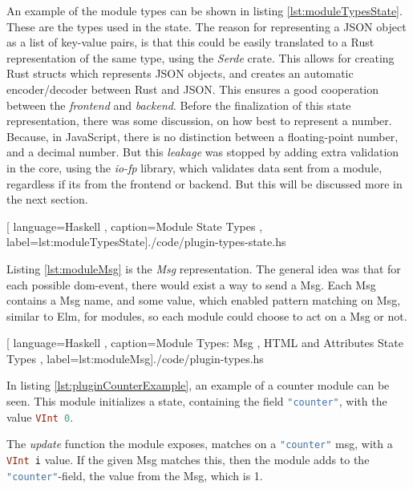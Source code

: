An example of the module types can be shown in listing
\ref{lst:moduleTypesState}. These are the types used in the state. The reason
for representing a JSON object as a list of key-value pairs, is that this could
be easily translated to a Rust representation of the same type, using the
\textit{Serde} crate. This allows for creating Rust structs which represents
JSON objects, and creates an automatic encoder/decoder between Rust and JSON.
This ensures a good cooperation between the \textit{frontend} and
\textit{backend}.
Before the finalization of this state representation, there was some
discussion, on how best to represent a number. Because, in JavaScript, there is
no distinction between a floating-point number, and a decimal number. But this
\textit{leakage} was stopped by adding extra validation in the core, using the
\textit{io-fp} library, which validates data sent from a module, regardless if
its from the frontend or backend. But this will be discussed more in the next
section.

\begin{center}
  
    [ language=Haskell
    , caption={Module State Types}
    , label=lst:moduleTypesState]{./code/plugin-types-state.hs}
\end{center}

Listing \ref{lst:moduleMsg} is the \textit{Msg} representation. The general idea
was that for each possible \gls{dom}-event, there would exist a way to send a
Msg. Each Msg contains a Msg name, and some value, which enabled pattern
matching on Msg, similar to Elm, for modules, so each module could choose to act
on a Msg or not.

\begin{center}
  \centering
  
    [ language=Haskell
    , caption={Module Types: Msg
    , HTML and Attributes State Types}
    , label=lst:moduleMsg]{./code/plugin-types.hs}
\end{center}

In listing \ref{lst:pluginCounterExample}, an example of a counter module can be
seen. This module initializes a state, containing the field
\lstinline[language=Haskell]{"counter"}, with the value
\lstinline[language=Haskell]{VInt 0}.

The \textit{update} function the module exposes, matches on a
\lstinline[language=Haskell]{"counter"} msg, with a
\lstinline[language=Haskell]{VInt i} value. If the given Msg matches this, then
the module adds to the \lstinline[language=Haskell]{"counter"}-field, the value
from the Msg, which is 1.

